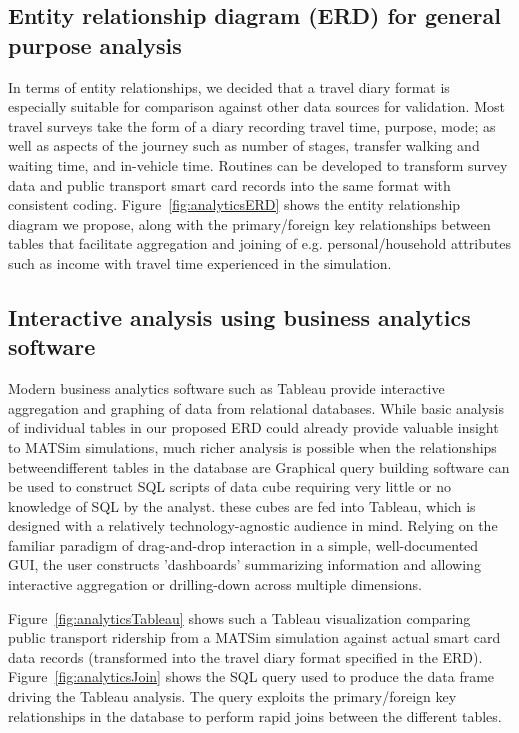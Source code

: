 \subsection{Entity relationship diagram (ERD) for general purpose analysis}

In terms of entity relationships, we decided that a travel diary format is especially suitable for comparison against other data sources for validation. Most travel surveys take the form of a diary recording travel time, purpose, mode; as well as aspects of the journey such as number of stages, transfer walking and waiting time, and in-vehicle time. Routines can be developed to transform survey data  and public transport smart card records into the same format with consistent coding. Figure~\ref{fig:analyticsERD} shows the entity relationship diagram  we propose, along with the primary/foreign key relationships between tables that facilitate aggregation and joining of e.g. personal/household attributes such as income with travel time experienced in the simulation.

\subsection{Interactive analysis using business analytics software}
Modern business analytics software such as Tableau \citep{Tableau_Webpage_2013} provide interactive aggregation and graphing of data from relational databases. While basic analysis of individual tables in our proposed ERD could already provide valuable insight to MATSim simulations, much richer analysis is possible when the relationships betweendifferent tables in the database are Graphical query building software can be used to construct SQL scripts of data cube requiring very little or no knowledge of SQL by the analyst. these cubes are fed into Tableau, which is designed with a relatively technology-agnostic audience in mind. Relying on the familiar paradigm of drag-and-drop interaction in a simple, well-documented GUI, the user constructs 'dashboards' summarizing information and allowing interactive aggregation or drilling-down across multiple dimensions.

Figure~\ref{fig:analyticsTableau} shows such a Tableau visualization comparing public transport ridership from a MATSim simulation against actual smart card data records (transformed into the travel diary format specified in the ERD). Figure~\ref{fig:analyticsJoin} shows the SQL query used to produce the data frame driving the Tableau analysis. The query exploits the primary/foreign key relationships in the database to perform rapid joins between the different tables.


